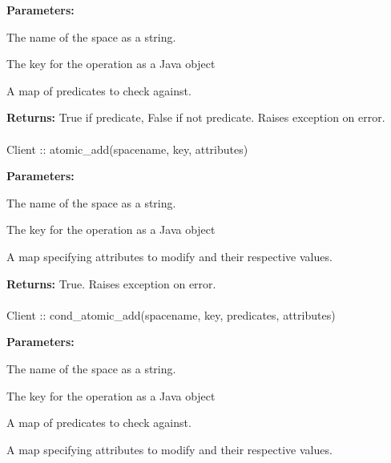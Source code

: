 \noindent\textbf{Parameters:}
\begin{description}[labelindent=\widthof{{\code{predicates}}},leftmargin=*,noitemsep,nolistsep,align=right]
\item[\code{spacename}] The name of the space as a string.
\item[\code{key}] The key for the operation as a Java object
\item[\code{predicates}] A map of predicates to check against.
\end{description}

\noindent\textbf{Returns:}
True if predicate, False if not predicate.  Raises exception on error.

\paragraph{}
\label{api:java:atomic_add}
\begin{javacode}
Client :: atomic_add(spacename, key, attributes)
\end{javacode}


\noindent\textbf{Parameters:}
\begin{description}[labelindent=\widthof{{\code{attributes}}},leftmargin=*,noitemsep,nolistsep,align=right]
\item[\code{spacename}] The name of the space as a string.
\item[\code{key}] The key for the operation as a Java object
\item[\code{attributes}] A map specifying attributes to modify and their respective values.
\end{description}

\noindent\textbf{Returns:}
True.  Raises exception on error.

\paragraph{}
\label{api:java:cond_atomic_add}
\begin{javacode}
Client :: cond_atomic_add(spacename, key, predicates, attributes)
\end{javacode}


\noindent\textbf{Parameters:}
\begin{description}[labelindent=\widthof{{\code{predicates}}},leftmargin=*,noitemsep,nolistsep,align=right]
\item[\code{spacename}] The name of the space as a string.
\item[\code{key}] The key for the operation as a Java object
\item[\code{predicates}] A map of predicates to check against.
\item[\code{attributes}] A map specifying attributes to modify and their respective values.
\end{description}

